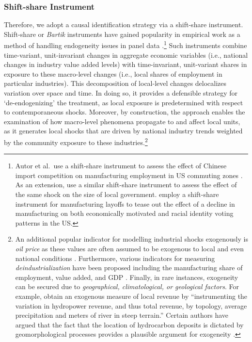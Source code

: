 \documentclass[
  10pt,
]{article}
\begin{document}
\subsubsection{Shift-share Instrument}\label{shift-share-instrument}

Therefore, we adopt a causal identification strategy via a shift-share
instrument. Shift-share or \emph{Bartik} instruments have gained
popularity in empirical work as a method of handling endogeneity issues
in panel data
\autocite{ferri2022,goldsmith-pinkham2020,bartik1991}.\footnote{Autor et
  al.~use a shift-share instrument to assess the effect of Chinese
  import competition on manufacturing employment in US commuting zones
  \autocite{autor2013}. As an extension, \autocite{feler2017} use a
  similar shift-share instrument to assess the effect of the same shock
  on the size of local government. \autocite{baccini2021} employ a
  shift-share instrument for manufacturing layoffs to tease out the
  effect of a decline in manufacturing on both economically motivated
  and racial identity voting patterns in the US.} Such instruments
combine time-variant, unit-invariant changes in aggregate economic
variables (i.e., national changes in industry value added levels) with
time-invariant, unit-variant shares in exposure to these macro-level
changes (i.e., local shares of employment in particular industries).
This decomposition of local-level changes delocalizes variation over
space and time. In doing so, it provides a defensible strategy for
`de-endogenizing' the treatment, as local exposure is predetermined with
respect to contemporaneous shocks. Moreover, by construction, the
approach enables the examination of how macro-level phenomena propagate
to and affect local units, as it generates local shocks that are driven
by national industry trends weighted by the community exposure to these
industries.\footnote{An additional popular indicator for modelling
  industrial shocks exogenously is \emph{oil price} as these values are
  often assumed to be exogenous to local and even national conditions
  \autocite{scheer2022}. Furthermore, various indicators for measuring
  \emph{deindustrialization} have been proposed including the
  manufacturing share of employment, value added, and GDP
  \autocite{tregenna2009,tregenna2020}. Finally, in rare instances,
  exogeneity can be secured due to \emph{geographical, climatological,
  or geological factors}. For example, \autocite{borge2015} obtain an
  exogenous measure of local revenue by ``instrumenting the variation in
  hydropower revenue, and thus total revenue, by topology, average
  precipitation and meters of river in steep terrain.'' Certain authors
  have argued that the fact that the location of hydrocarbon deposits is
  dictated by geomorphological processes provides a plausible argument
  for exogeneity \autocite{esposito2021,chen2022}.}
\end{document}
